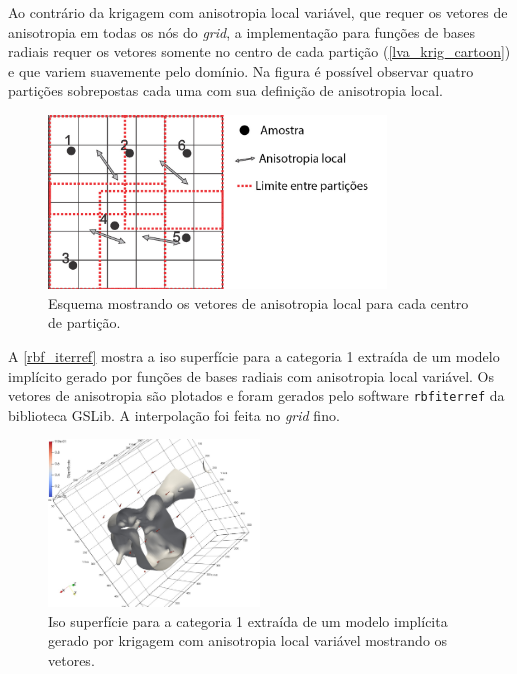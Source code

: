 Ao contrário da krigagem com anisotropia local variável, que requer os vetores de anisotropia em todas os nós do \textit{grid}, a implementação para funções de bases radiais requer os vetores somente no centro de cada partição (\autoref{lva_krig_cartoon}) e que variem suavemente pelo domínio. Na figura é possível observar quatro partições sobrepostas cada uma com sua definição de anisotropia local.

\begin{figure}[H]
\caption{\label{lva_rbf+cartoon} Esquema mostrando os vetores de anisotropia local para cada centro de partição.}
	\begin{center}
		\includegraphics[width=0.8\textwidth]{capitulo_2/lvarbf1.jpg}
	\end{center}
\end{figure}

A \autoref{rbf_iterref} mostra a iso superfície para a categoria 1 extraída de um modelo implícito gerado por funções de bases radiais com anisotropia local variável. Os vetores de anisotropia são plotados e foram gerados pelo software \verb|rbfiterref| \cite{martin_boisvert_review_rbf} da biblioteca GSLib. A interpolação foi feita no \textit{grid} fino.

\begin{figure}[H]
\caption{\label{rbf_iterref}Iso superfície para a categoria 1 extraída de um modelo implícita gerado por krigagem com anisotropia local variável mostrando os vetores.}
	\begin{center}
		\includegraphics[width=0.5\textwidth]{capitulo_2/rbf_iterref.jpeg}
	\end{center}
\end{figure}

